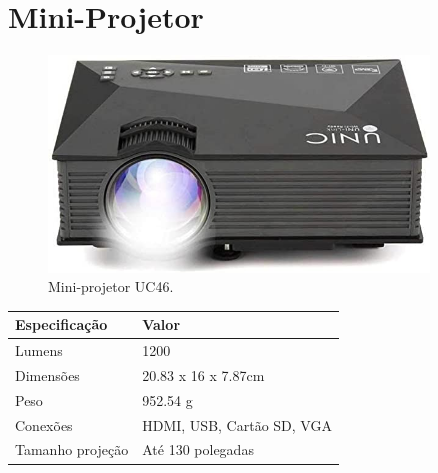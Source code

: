 \chapter{Mini-Projetor}
\label{apendice_projetor}

\begin{figure}[!h]
\includegraphics[width=0.9\textwidth,fbox]{figs/projetor.jpg}
\caption{Mini-projetor UC46. }
\end{figure}

\begin{longtable}{|p{}|p{}|}
    \hline
    \textbf{Especificação} & \textbf{Valor} \\ \hline
    Lumens & 1200 \\ \hline
    Dimensões & 20.83 x 16 x 7.87cm \\ \hline
    Peso & 952.54 g \\ \hline
    Conexões & HDMI, USB, Cartão SD, VGA \\ \hline
    Tamanho projeção & Até 130 polegadas \\ \hline
\end{longtable}